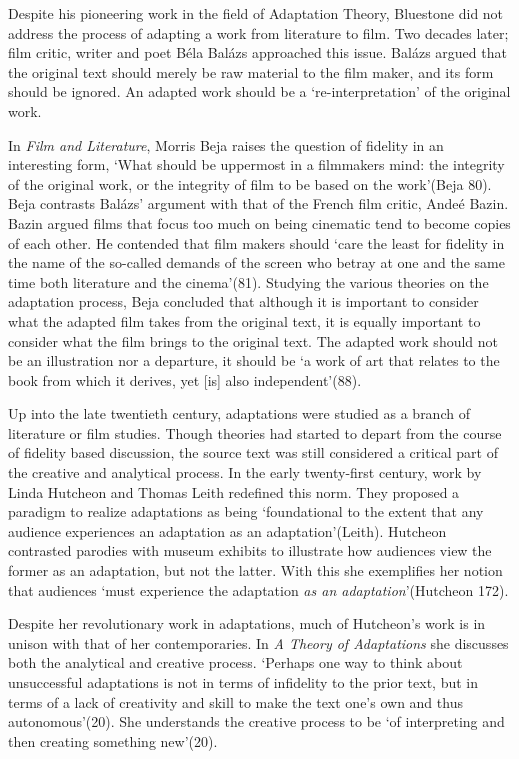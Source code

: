 \documentclass[12pt]{article}
\begin{document}
Despite his pioneering work in the field of Adaptation Theory, Bluestone did not
address the process of adapting a work from literature to film. Two decades
later; film critic, writer and poet B\'{e}la Bal\'{a}zs approached this issue.
Bal\'{a}zs argued that the original text should merely be raw material to the film
maker, and its form should be ignored. An adapted work should be a
`re-interpretation' of the original work. 

In \textit{Film and Literature}, Morris Beja raises the question of fidelity in an interesting form, `What
should be uppermost in a filmmakers mind: the integrity of the original work,
or the integrity of film to be based on the work'(Beja 80). Beja contrasts Bal\'{a}zs'
argument with that of the French film critic, Ande\'{e} Bazin. Bazin argued
films that focus too much on being cinematic tend to become
copies of each other. He contended that film makers should `care the least for
fidelity in the name of the so-called demands of the screen who betray at one
and the same time both literature and the cinema'(81). Studying the various theories
on the adaptation process, Beja concluded that although it is important to
consider what the adapted film takes from the original text, it is equally
important to consider what the film brings to the original text. The adapted
work should not be an illustration nor a departure, it should be `a work of art
that relates to the book from which it derives, yet [is] also independent'(88). 

Up into the late twentieth century, adaptations were studied as a branch of
literature or film studies. Though theories had started to depart from the
course of fidelity based discussion, the source text was still considered a critical part
of the creative and analytical process. In the early twenty-first century,
work by Linda Hutcheon and Thomas Leith redefined this norm. 
They proposed a paradigm to realize adaptations as being `foundational to the 
extent that any audience experiences an adaptation as an adaptation'(Leith). Hutcheon
contrasted parodies with museum exhibits to illustrate how
audiences view the former as an adaptation, but not the latter. With this she
exemplifies her notion that audiences `must experience the 
adaptation \textit{as an adaptation}'(Hutcheon 172).

Despite her revolutionary work in adaptations, much of
Hutcheon's work is in unison with that of her contemporaries. In 
\textit{A Theory of Adaptations} she discusses both the analytical and 
creative process. `Perhaps one way to think about unsuccessful adaptations
is not in terms of infidelity to the prior text, but in terms of a lack of
creativity and skill to make the text one's own and thus autonomous'(20). She
understands the creative process to be `of interpreting and then creating
something new'(20).
\end{document}
